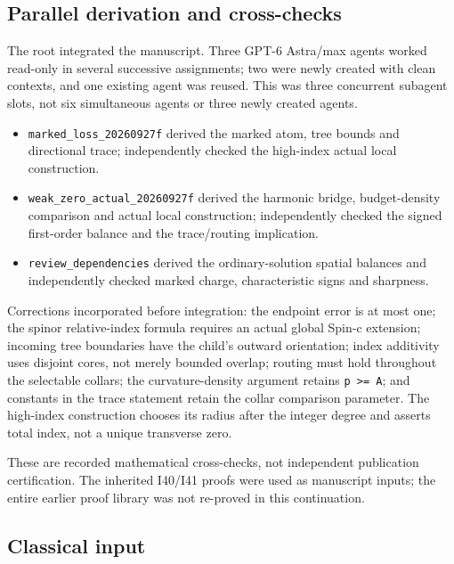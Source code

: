 \documentclass[
  10pt,
]{article}
\providecommand{\tightlist}{%
  \setlength{\itemsep}{0pt}\setlength{\parskip}{0pt}}
\begin{document}
\hypertarget{parallel-derivation-and-cross-checks}{%
\subsection{Parallel derivation and
cross-checks}\label{parallel-derivation-and-cross-checks}}

The root integrated the manuscript. Three GPT-6 Astra/max agents worked
read-only in several successive assignments; two were newly created with
clean contexts, and one existing agent was reused. This was three
concurrent subagent slots, not six simultaneous agents or three newly
created agents.

\begin{itemize}
\tightlist
\item
  \nolinkurl{marked_loss_20260927f} derived the marked atom, tree bounds
  and directional trace; independently checked the high-index actual
  local construction.
\item
  \nolinkurl{weak_zero_actual_20260927f} derived the harmonic bridge,
  budget-density comparison and actual local construction; independently
  checked the signed first-order balance and the trace/routing
  implication.
\item
  \nolinkurl{review_dependencies} derived the ordinary-solution spatial
  balances and independently checked marked charge, characteristic signs
  and sharpness.
\end{itemize}

Corrections incorporated before integration: the endpoint error is at
most one; the spinor relative-index formula requires an actual global
Spin-c extension; incoming tree boundaries have the child's outward
orientation; index additivity uses disjoint cores, not merely bounded
overlap; routing must hold throughout the selectable collars; the
curvature-density argument retains \texttt{p\ \textgreater{}=\ A}; and
constants in the trace statement retain the collar comparison parameter.
The high-index construction chooses its radius after the integer degree
and asserts total index, not a unique transverse zero.

These are recorded mathematical cross-checks, not independent
publication certification. The inherited I40/I41 proofs were used as
manuscript inputs; the entire earlier proof library was not re-proved in
this continuation.

\hypertarget{classical-input}{%
\subsection{Classical input}\label{classical-input}}
\end{document}
